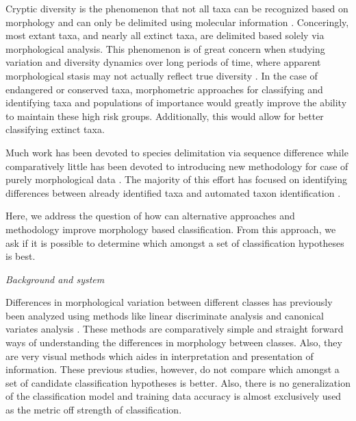 \documentclass[12pt,letterpaper]{article}\usepackage{graphicx, color}
\renewcommand{\section}[1]{%
\bigskip
\begin{center}
\begin{Large}
\normalfont\scshape #1
\medskip
\end{Large}
\end{center}}
\renewcommand{\subsection}[1]{%
\bigskip
\begin{center}
\begin{large}
\normalfont\itshape #1
\end{large}
\end{center}}
\begin{document}

Cryptic diversity is the phenomenon that not all taxa can be recognized based on morphology and can only be delimited using molecular information \citep{Stuart2006,Pfenninger2007,Funk2012,Clare2011}. Conceringly, most extant taxa, and nearly all extinct taxa, are delimited based solely via morphological analysis. This phenomenon is of great concern when studying variation and diversity dynamics over long periods of time, where apparent morphological stasis may not actually reflect true diversity \citep{Hunt2008,Eldredge1972,Gould1977a}. In the case of endangered or conserved taxa, morphometric approaches for classifying and identifying taxa and populations of importance would greatly improve the ability to maintain these high risk groups. Additionally, this would allow for better classifying extinct taxa.

Much work has been devoted to species delimitation via sequence difference \citep{Fujita2012,Yang2010b} while comparatively little has been devoted to introducing new methodology for case of purely morphological data \citep{Mitteroecker2011,Zelditch2004}. The majority of this effort has focused on identifying differences between already identified taxa \citep{Polly2007a,Demandt2009,Gaubert2005b,Gunduz2007,Polly2003,Zelditch2004} and automated taxon identification \citep{MacLeod2007}.

Here, we address the question of how can alternative approaches and methodology improve morphology based classification. From this approach, we ask if it is possible to determine which amongst a set of classification hypotheses is best.

\subsection{Background and system}
Differences in morphological variation between different classes has previously been analyzed using methods like linear discriminate analysis and canonical variates analysis \citep{Zelditch2004,Mitteroecker2011,Polly2007a,Polly2003,Gunduz2007,Gaubert2005b,Demandt2009}. These methods are comparatively simple and straight forward ways of understanding the differences in morphology between classes. Also, they are very visual methods which aides in interpretation and presentation of information. These previous studies, however, do not compare which amongst a set of candidate classification hypotheses is better. Also, there is no generalization of the classification model and training data accuracy is almost exclusively used as the metric off strength of classification.
\end{document}
